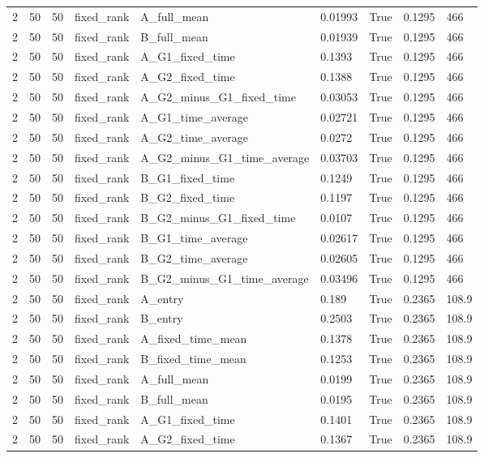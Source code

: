 \begin{longtable}{lllllllll}
2 & 50 & 50 & fixed\_rank & A\_full\_mean & 0.01993 & True & 0.1295 & 466 \\
2 & 50 & 50 & fixed\_rank & B\_full\_mean & 0.01939 & True & 0.1295 & 466 \\
2 & 50 & 50 & fixed\_rank & A\_G1\_fixed\_time & 0.1393 & True & 0.1295 & 466 \\
2 & 50 & 50 & fixed\_rank & A\_G2\_fixed\_time & 0.1388 & True & 0.1295 & 466 \\
2 & 50 & 50 & fixed\_rank & A\_G2\_minus\_G1\_fixed\_time & 0.03053 & True & 0.1295 & 466 \\
2 & 50 & 50 & fixed\_rank & A\_G1\_time\_average & 0.02721 & True & 0.1295 & 466 \\
2 & 50 & 50 & fixed\_rank & A\_G2\_time\_average & 0.0272 & True & 0.1295 & 466 \\
2 & 50 & 50 & fixed\_rank & A\_G2\_minus\_G1\_time\_average & 0.03703 & True & 0.1295 & 466 \\
2 & 50 & 50 & fixed\_rank & B\_G1\_fixed\_time & 0.1249 & True & 0.1295 & 466 \\
2 & 50 & 50 & fixed\_rank & B\_G2\_fixed\_time & 0.1197 & True & 0.1295 & 466 \\
2 & 50 & 50 & fixed\_rank & B\_G2\_minus\_G1\_fixed\_time & 0.0107 & True & 0.1295 & 466 \\
2 & 50 & 50 & fixed\_rank & B\_G1\_time\_average & 0.02617 & True & 0.1295 & 466 \\
2 & 50 & 50 & fixed\_rank & B\_G2\_time\_average & 0.02605 & True & 0.1295 & 466 \\
2 & 50 & 50 & fixed\_rank & B\_G2\_minus\_G1\_time\_average & 0.03496 & True & 0.1295 & 466 \\
2 & 50 & 50 & fixed\_rank & A\_entry & 0.189 & True & 0.2365 & 108.9 \\
2 & 50 & 50 & fixed\_rank & B\_entry & 0.2503 & True & 0.2365 & 108.9 \\
2 & 50 & 50 & fixed\_rank & A\_fixed\_time\_mean & 0.1378 & True & 0.2365 & 108.9 \\
2 & 50 & 50 & fixed\_rank & B\_fixed\_time\_mean & 0.1253 & True & 0.2365 & 108.9 \\
2 & 50 & 50 & fixed\_rank & A\_full\_mean & 0.0199 & True & 0.2365 & 108.9 \\
2 & 50 & 50 & fixed\_rank & B\_full\_mean & 0.0195 & True & 0.2365 & 108.9 \\
2 & 50 & 50 & fixed\_rank & A\_G1\_fixed\_time & 0.1401 & True & 0.2365 & 108.9 \\
2 & 50 & 50 & fixed\_rank & A\_G2\_fixed\_time & 0.1367 & True & 0.2365 & 108.9 \\

\end{longtable}
